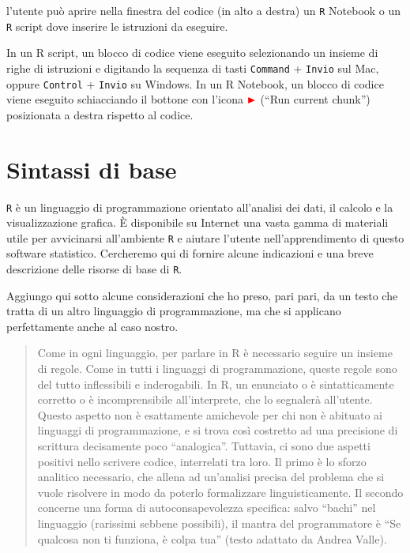 \documentclass[
]{memoir}
\theoremstyle{definition}
\theoremstyle{definition}
\theoremstyle{definition}
\theoremstyle{definition}
\theoremstyle{remark}
\begin{document}
l'utente può aprire nella finestra del codice (in alto a destra) un \texttt{R} Notebook o un \texttt{R} script dove inserire le istruzioni da eseguire.

In un R script, un blocco di codice viene eseguito selezionando un
insieme di righe di istruzioni e digitando la sequenza di tasti
\texttt{Command} + \texttt{Invio} sul Mac, oppure \texttt{Control} + \texttt{Invio} su Windows. In
un R Notebook, un blocco di codice viene eseguito schiacciando il
bottone con l'icona \(\color{red}\blacktriangleright\) (``Run current
chunk'') posizionata a destra rispetto al codice.

\hypertarget{chapter-sintassi}{%
\section{Sintassi di base}\label{chapter-sintassi}}

\texttt{R} è un linguaggio di programmazione orientato all'analisi dei dati, il
calcolo e la visualizzazione grafica. È disponibile su Internet una
vasta gamma di materiali utile per avvicinarsi all'ambiente \texttt{R} e aiutare
l'utente nell'apprendimento di questo software statistico. Cercheremo
qui di fornire alcune indicazioni e una breve descrizione delle risorse
di base di \texttt{R}.

Aggiungo qui sotto alcune considerazioni che ho preso, pari pari, da un testo che tratta di un altro linguaggio di programmazione, ma che si applicano perfettamente anche al caso nostro.

\begin{quote}
Come in ogni linguaggio, per parlare in R è necessario seguire un insieme di regole. Come in tutti i linguaggi di programmazione, queste regole sono del tutto inflessibili e inderogabili. In R, un enunciato o è sintatticamente corretto o è incomprensibile all'interprete, che lo segnalerà all'utente. Questo aspetto non è esattamente amichevole per chi non è abituato ai linguaggi di programmazione, e si trova così costretto ad una precisione di scrittura decisamente poco ``analogica''. Tuttavia, ci sono due aspetti positivi nello scrivere codice, interrelati tra loro. Il primo è lo sforzo analitico necessario, che allena ad un'analisi precisa del problema che si vuole risolvere in modo da poterlo formalizzare linguisticamente. Il secondo concerne una forma di autoconsapevolezza specifica: salvo ``bachi'' nel linguaggio (rarissimi sebbene possibili), il mantra del programmatore è ``Se qualcosa non ti funziona, è colpa tua'' (testo adattato da Andrea Valle).
\end{quote}
\end{document}
